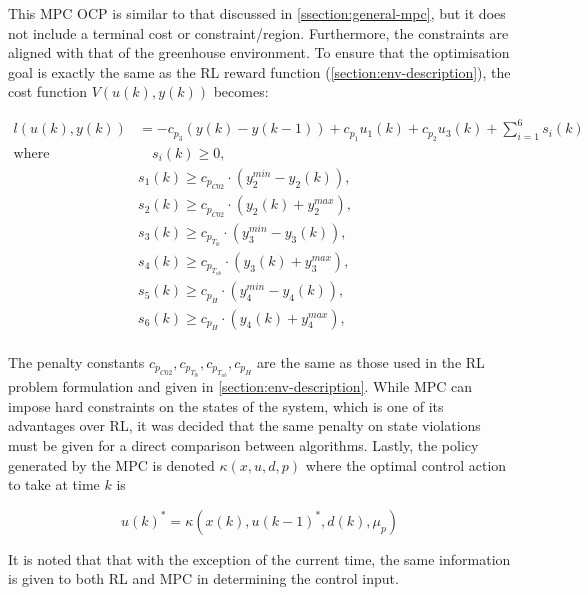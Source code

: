 This MPC OCP is similar to that discussed in \autoref{ssection:general-mpc}, but it does not include a terminal cost or constraint/region. Furthermore, the constraints are aligned with that of the greenhouse environment. To ensure that the optimisation goal is exactly the same as the RL reward function (\autoref{section:env-description}), the cost function $V(u(k),y(k))$ becomes:

\begin{equation} \label{eq:mpc_stage_cost}
	\begin{aligned}
		l(u(k),y(k)) & = - c_{p_3} (y(k) - y(k-1)) + c_{p_1} u_{1}(k) + c_{p_2} u_{3}(k) + \sum_{i = 1}^6 s_i(k) \\
		\text{where} & \quad s_i(k) \geq 0, \\
		& s_1(k) \geq c_{p_{C02}} \cdot (y_2^{min} - y_2(k)), \\ 
		& s_2(k) \geq c_{p_{C02}} \cdot (y_2(k) + y_2^{max}), \\ 
		& s_3(k) \geq c_{p_{T_{lb}}} \cdot (y_3^{min} - y_3(k)), \\ 
		& s_4(k) \geq c_{p_{T_{ub}}} \cdot (y_3(k) + y_3^{max}), \\ 
		& s_5(k) \geq c_{p_{H}} \cdot (y_4^{min} - y_4(k)), \\ 
		& s_6(k) \geq c_{p_{H}} \cdot (y_4(k) + y_4^{max}), \\
	\end{aligned}	
\end{equation}

The penalty constants $c_{p_{C02}},c_{p_{T_{lb}}},c_{p_{T_{ub}}},c_{p_{H}}$ are the same as those used in the RL problem formulation and given in \autoref{section:env-description}. While MPC can impose hard constraints on the states of the system, which is one of its advantages over RL, it was decided that the same penalty on state violations must be given for a direct comparison between algorithms. Lastly, the policy generated by the MPC is denoted $\kappa(x,u,d,p)$ where the optimal control action to take at time $k$ is

\begin{equation}\label{eq:mpc_policy_notation}
	u(k)^* = \kappa(x(k),u(k-1)^*, d(k), \mu_p)
\end{equation}

It is noted that that with the exception of the current time, the same information is given to both RL and MPC in determining the control input.

